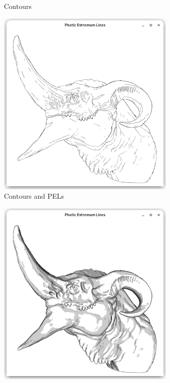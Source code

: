 \documentclass[9pt,fleqn,twoside,twocolumn]{stdglobal}
\begin{document}
\begin{figure}
\begin{subfigure}[b]{0.24\textwidth}
        \caption{Contours}
      \end{subfigure}%
      \hfill%
      \begin{subfigure}[b]{0.24\textwidth}
        \centering
        \includegraphics[width=0.95\textwidth,trim={15px 15 15 50},clip]{images/dragon-head-contour-pel-shader.png}
        \caption{Contours and PELs}
      \end{subfigure}%
      \hfill
      \begin{subfigure}[b]{0.24\textwidth}
        \centering
        \includegraphics[width=0.95\textwidth,trim={15px 15 15 50},clip]{images/dragon-head-contour-pel-toon-shader.png}

\end{subfigure}
\end{figure}
\end{document}
